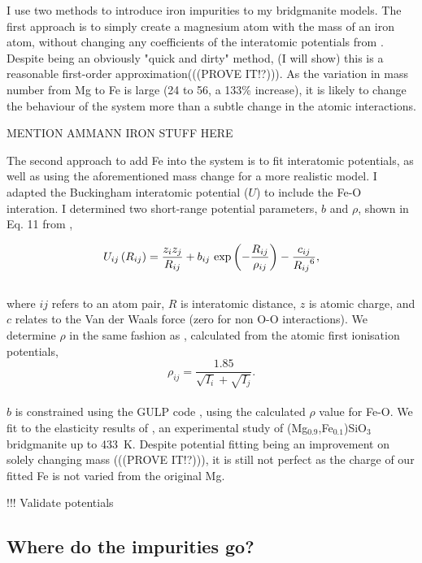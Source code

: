 I use two methods to introduce iron impurities to my bridgmanite models. The first approach is to simply create a magnesium atom with the mass of an iron atom, without changing any coefficients of the interatomic potentials from \citet{Oganov2000}. Despite being an obviously "quick and dirty" method, (I will show) this is a reasonable first-order approximation(((PROVE IT!?))). As the variation in mass number from Mg to Fe is large (24 to 56, a 133\% increase), it is likely to change the behaviour of the system more than a subtle change in the atomic interactions.

MENTION AMMANN IRON STUFF HERE

The second approach to add Fe into the \mgsios system is to fit interatomic potentials, as well as using the aforementioned mass change for a more realistic model. I adapted the \citet{Oganov2000} \mgsios Buckingham interatomic potential ($U$) to include the Fe-O interation. I determined two short-range potential parameters, $b$ and $\rho$, shown in Eq. 11 from \citet{Oganov2000},

\begin{equation}
U_{ij}\left ( R_{ij} \right ) = \frac{z_{i}z_{j}}{R_{ij}} + b_{ij}\ \textup{exp}\left ( - \frac{R_{ij}}{\rho_{ij}} \right ) - \frac{c_{ij}}{{R_{ij}}^{6}}, \label{og_buck}
\end{equation}
\\
where $ij$ refers to an atom pair, $R$ is interatomic distance, $z$ is atomic charge, and $c$ relates to the Van der Waals force (zero for non O-O interactions). We determine $\rho$ in the same fashion as \citet{Oganov2000}, calculated from the atomic first ionisation potentials,\\
\begin{equation}
\rho_{ij} = \frac{1.85}{\sqrt{I_{i}}+\sqrt{I_{j}}}.  \label{urusov}
\end{equation}
\\
$b$ is constrained using the GULP code \citep{Gale1997}, using the calculated $\rho$ value for Fe-O. We fit to the elasticity results of \citet{Parise1990}, an experimental study of (Mg$_{0.9}$,Fe$_{0.1}$)SiO$_3$ bridgmanite up to 433~K. Despite potential fitting being an improvement on solely changing mass (((PROVE IT!?))), it is still not perfect as the charge of our fitted Fe is not varied from the original Mg.

!!! Validate potentials


\subsection{Where do the impurities go?} 

